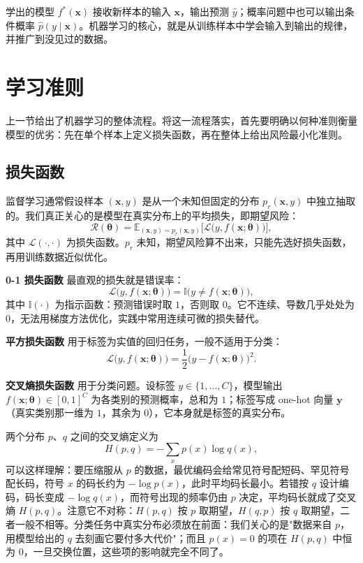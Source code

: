 \documentclass[UTF8,a4paper,12pt]{ctexart}
\numberwithin{equation}{section}
\begin{document}
	学出的模型 $f^{*}(\bm{x})$ 接收新样本的输入 $\bm{x}$，输出预测 $\hat{y}$；概率问题中也可以输出条件概率 $\hat{p}(y\mid\bm{x})$。机器学习的核心，就是从训练样本中学会输入到输出的规律，并推广到没见过的数据。

\section{学习准则}

上一节给出了机器学习的整体流程。将这一流程落实，首先要明确以何种准则衡量模型的优劣：先在单个样本上定义损失函数，再在整体上给出风险最小化准则。

\subsection{损失函数}

监督学习通常假设样本 $(\bm{x},y)$ 是从一个未知但固定的分布 $p_r(\bm{x},y)$ 中独立抽取的。我们真正关心的是模型在真实分布上的平均损失，即期望风险：
\begin{equation}\label{eq:2.1}
\mathcal{R}(\bm{\theta})
=\mathbb{E}_{(\bm{x},y)\sim p_r(\bm{x},y)}
\bigl[\mathcal{L}\bigl(y,f(\bm{x};\bm{\theta})\bigr)\bigr],
\end{equation}
其中 $\mathcal{L}(\cdot,\cdot)$ 为损失函数。$p_r$ 未知，期望风险算不出来，只能先选好损失函数，再用训练数据近似优化。

\noindent\textbf{0-1 损失函数} 最直观的损失就是错误率：
\begin{equation}\label{eq:2.2}
\mathcal{L}\bigl(y,f(\bm{x};\bm{\theta})\bigr)
=\mathbb{I}\bigl(y\neq f(\bm{x};\bm{\theta})\bigr),
\end{equation}
其中 $\mathbb{I}(\cdot)$ 为指示函数：预测错误时取 $1$，否则取 $0$。它不连续、导数几乎处处为 $0$，无法用梯度方法优化，实践中常用连续可微的损失替代。

\noindent\textbf{平方损失函数} 用于标签为实值的回归任务，一般不适用于分类：
\begin{equation}\label{eq:2.3}
\mathcal{L}\bigl(y,f(\bm{x};\bm{\theta})\bigr)
=\frac{1}{2}\bigl(y-f(\bm{x};\bm{\theta})\bigr)^{2}.
\end{equation}

\noindent\textbf{交叉熵损失函数} 用于分类问题。设标签 $y\in\{1,\ldots,C\}$，模型输出 $f(\bm{x};\bm{\theta})\in[0,1]^{C}$ 为各类别的预测概率，总和为 $1$；标签写成 one-hot 向量 $\bm{y}$（真实类别那一维为 $1$，其余为 $0$），它本身就是标签的真实分布。

两个分布 $p$、$q$ 之间的交叉熵定义为
\begin{equation}\label{eq:2.4}
H(p,q)=-\sum_{x}p(x)\log q(x),
\end{equation}
可以这样理解：要压缩服从 $p$ 的数据，最优编码会给常见符号配短码、罕见符号配长码，符号 $x$ 的码长约为 $-\log p(x)$，此时平均码长最小。若错按 $q$ 设计编码，码长变成 $-\log q(x)$，而符号出现的频率仍由 $p$ 决定，平均码长就成了交叉熵 $H(p,q)$。注意它不对称：$H(p,q)$ 按 $p$ 取期望，$H(q,p)$ 按 $q$ 取期望，二者一般不相等。分类任务中真实分布必须放在前面：我们关心的是"数据来自 $p$，用模型给出的 $q$ 去刻画它要付多大代价"；而且 $p(x)=0$ 的项在 $H(p,q)$ 中恒为 $0$，一旦交换位置，这些项的影响就完全不同了。
\end{document}
